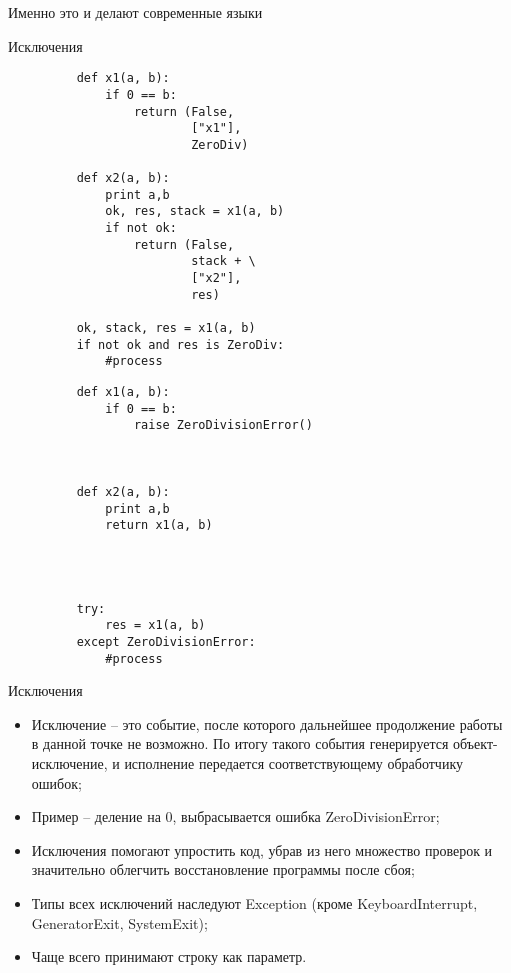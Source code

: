 \documentclass{article}
\begin{document}
\begin{center} Именно это и делают современные языки \end{center}
\begin{center} Исключения \end{center}
\begin{figure}[ht]
\begin{minipage}[b]{0.45\linewidth}
\Large
\begin{lstlisting}
	def x1(a, b):
		if 0 == b:
			return (False, 
				    ["x1"],
				    ZeroDiv)

	def x2(a, b):
		print a,b
		ok, res, stack = x1(a, b)
		if not ok:
			return (False, 
					stack + \
					["x2"],
					res)

	ok, stack, res = x1(a, b)
	if not ok and res is ZeroDiv:
		#process
\end{lstlisting}
\end{minipage}
\hspace{2cm}
\begin{minipage}[b]{0.45\linewidth}
\Large
\begin{lstlisting}
	def x1(a, b):
		if 0 == b:
			raise ZeroDivisionError()



	def x2(a, b):
		print a,b
		return x1(a, b)




	try:
		res = x1(a, b)
	except ZeroDivisionError:
		#process
\end{lstlisting}
\end{minipage}
\end{figure}
\newpage

\begin{center} Исключения \end{center}
\begin{itemize}
	\item Исключение – это событие, после которого дальнейшее продолжение 
			работы в данной точке не возможно. По итогу такого события 
			генерируется объект-исключение, и исполнение передается соответствующему 
			обработчику ошибок;
	\item Пример – деление на 0, выбрасывается ошибка ZeroDivisionError;
	\item Исключения помогают упростить код, убрав из него множество 
			проверок и значительно облегчить восстановление программы после сбоя;
	\item Типы всех исключений наследуют Exception (кроме KeyboardInterrupt, GeneratorExit, SystemExit);
	\item Чаще всего принимают строку как параметр.
\end{itemize}
\newpage
\end{document}
